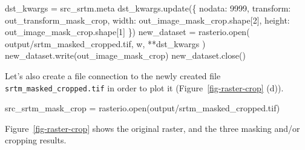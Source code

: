 \documentclass[
  letterpaper,
]{krantz}
\newenvironment{Shaded}{\begin{snugshade}}{\end{snugshade}}
\newcommand{\BuiltInTok}[1]{\textcolor[rgb]{0.00,0.23,0.31}{#1}}
\newcommand{\DecValTok}[1]{\textcolor[rgb]{0.68,0.00,0.00}{#1}}
\newcommand{\NormalTok}[1]{\textcolor[rgb]{0.00,0.23,0.31}{#1}}
\newcommand{\OperatorTok}[1]{\textcolor[rgb]{0.37,0.37,0.37}{#1}}
\newcommand{\StringTok}[1]{\textcolor[rgb]{0.13,0.47,0.30}{#1}}
\begin{document}
\begin{Shaded}
\begin{Highlighting}[]
\NormalTok{dst\_kwargs }\OperatorTok{=}\NormalTok{ src\_srtm.meta}
\NormalTok{dst\_kwargs.update(\{}
    \StringTok{\textquotesingle{}nodata\textquotesingle{}}\NormalTok{: }\DecValTok{9999}\NormalTok{,}
    \StringTok{\textquotesingle{}transform\textquotesingle{}}\NormalTok{: out\_transform\_mask\_crop,}
    \StringTok{\textquotesingle{}width\textquotesingle{}}\NormalTok{: out\_image\_mask\_crop.shape[}\DecValTok{2}\NormalTok{],}
    \StringTok{\textquotesingle{}height\textquotesingle{}}\NormalTok{: out\_image\_mask\_crop.shape[}\DecValTok{1}\NormalTok{]}
\NormalTok{\})}
\NormalTok{new\_dataset }\OperatorTok{=}\NormalTok{ rasterio.}\BuiltInTok{open}\NormalTok{(}
    \StringTok{\textquotesingle{}output/srtm\_masked\_cropped.tif\textquotesingle{}}\NormalTok{, }
    \StringTok{\textquotesingle{}w\textquotesingle{}}\NormalTok{, }
    \OperatorTok{**}\NormalTok{dst\_kwargs}
\NormalTok{)}
\NormalTok{new\_dataset.write(out\_image\_mask\_crop)}
\NormalTok{new\_dataset.close()}
\end{Highlighting}
\end{Shaded}

Let's also create a file connection to the newly created file
\texttt{srtm\_masked\_cropped.tif} in order to plot it
(Figure~\ref{fig-raster-crop} (d)).

\begin{Shaded}
\begin{Highlighting}[]
\NormalTok{src\_srtm\_mask\_crop }\OperatorTok{=}\NormalTok{ rasterio.}\BuiltInTok{open}\NormalTok{(}\StringTok{\textquotesingle{}output/srtm\_masked\_cropped.tif\textquotesingle{}}\NormalTok{)}
\end{Highlighting}
\end{Shaded}

Figure~\ref{fig-raster-crop} shows the original raster, and the three
masking and/or cropping results.
\end{document}
